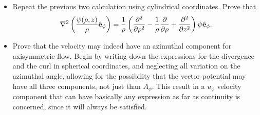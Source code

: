 \begin{itemize}
\item Repeat the previous two calculation using cylindrical
  coordinates. Prove that
  \begin{equation}
    \label{eq:psi_eq_from_A_cyl}
    \nabla^2 \left(  \frac{\psi(\rho ,z) }{\rho} \hat{\mathbf{e}}_\phi \right) =
    \frac{1}{ \rho } 
    \left(
      \frac{\partial^2  }{\partial \rho^2} -
      \frac{1}{ \rho } 
      \frac{\partial  }{\partial \rho} +
      \frac{\partial^2  }{\partial z^2}
    \right) \psi \hat{\mathbf{e}}_\phi .
  \end{equation}
  

\item \label{ex:azimuthal_velocity} Prove that the velocity may
  indeed have an azimuthal component for axisymmetric flow. Begin by
  writing down the expressions for the divergence and the curl in
  spherical coordinates, and neglecting all variation on the azimuthal
  angle, allowing for the possibility that the vector potential may
  have all three components, not just than $A_\phi$.  This result in a
  $u_\phi$ velocity component that can have basically any expression
  as far as continuity is concerned, since it will always be
  satisfied.


\end{itemize}



